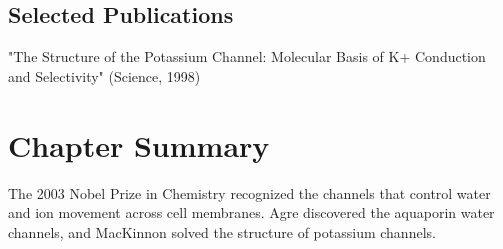 \subsection*{Selected Publications}

"The Structure of the Potassium Channel: Molecular Basis of K+ Conduction and Selectivity" (Science, 1998)

\clearpage

\section*{Chapter Summary}

The 2003 Nobel Prize in Chemistry recognized the channels that control water and ion movement across cell membranes. Agre discovered the aquaporin water channels, and MacKinnon solved the structure of potassium channels.
